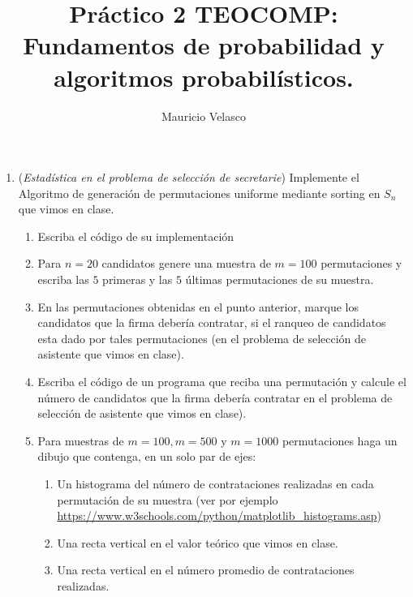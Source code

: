 \documentclass[12pt, a4paper]{article}
\date{}
\begin{document}
\title{Pr\'actico 2 TEOCOMP: Fundamentos de probabilidad y algoritmos probabilísticos.}
\author{Mauricio Velasco}
\maketitle{}


\begin{enumerate}

\item ({\it Estadística en el problema de selección de secretarie}) Implemente el Algoritmo de generación de permutaciones uniforme mediante sorting en $S_n$ que vimos en clase. 
\begin{enumerate}
\item Escriba el código de su implementación
\item Para $n=20$ candidatos genere una muestra de $m=100$ permutaciones y escriba las $5$ primeras y las $5$ últimas permutaciones de su muestra.
\item En las permutaciones obtenidas en el punto anterior, marque los candidatos que la firma debería contratar, si el ranqueo de candidatos esta dado por tales permutaciones (en el problema de selección de asistente que vimos en clase).
\item Escriba el código de un programa que reciba una permutación y calcule el número de candidatos que la firma debería contratar en el problema de selección de asistente que vimos en clase).
\item Para muestras de $m=100,m=500$ y $m=1000$ permutaciones haga un dibujo que contenga, en un solo par de ejes:
\begin{enumerate}
\item Un histograma del número de contrataciones  realizadas en cada permutación de su muestra (ver por ejemplo \url{https://www.w3schools.com/python/matplotlib_histograms.asp})
\item Una recta vertical en el valor teórico que vimos en clase.
\item Una recta vertical en el número promedio de contrataciones realizadas.
\end{enumerate}

\end{enumerate}




\end{enumerate}
\end{document}
